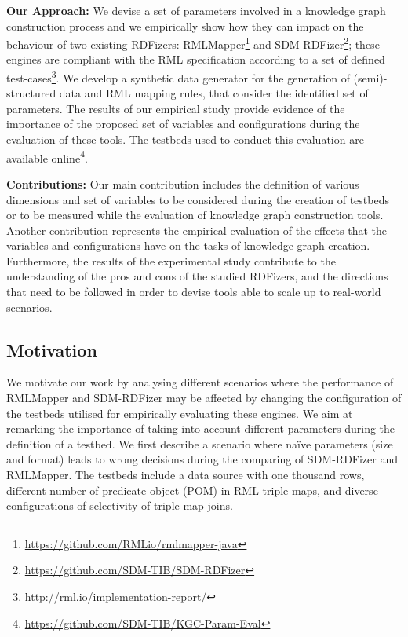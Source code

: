 \noindent \textbf{Our Approach:} We devise a set of parameters involved in a knowledge graph construction process and we empirically show how they can impact on the behaviour of two existing RDFizers: RMLMapper\footnote{\url{https://github.com/RMLio/rmlmapper-java}} and SDM-RDFizer\footnote{\url{https://github.com/SDM-TIB/SDM-RDFizer}}; these engines are compliant with the RML specification according to a set of defined test-cases\footnote{\url{http://rml.io/implementation-report/}}. We develop a synthetic data generator for the generation of (semi)-structured data and RML mapping rules, that consider the identified set of parameters.
The results of our empirical study provide evidence of the importance of the proposed set of variables and configurations during the evaluation of these tools. The testbeds used to conduct this evaluation are available
online\footnote{\url{https://github.com/SDM-TIB/KGC-Param-Eval}}.

\noindent \textbf{Contributions:} 
Our main contribution includes the definition of various dimensions and set of variables to be considered during the creation of testbeds or to be measured while the evaluation of knowledge graph construction tools.
Another contribution represents the empirical evaluation of the effects that the variables and configurations have on the tasks of knowledge graph creation. 
Furthermore, the results of the experimental study contribute to the understanding of the pros and cons of the studied RDFizers, and the directions that need to be followed in order to devise tools able to scale up to real-world scenarios.  

\subsection{Motivation}

We motivate our work by analysing different scenarios where the performance of RMLMapper and SDM-RDFizer may be affected by changing the configuration of the testbeds utilised for empirically evaluating these engines. We aim at remarking the importance of taking into account different parameters during the definition of a testbed.
We first describe a scenario where na\"ive parameters (size and format) leads to wrong decisions during the comparing of SDM-RDFizer and RMLMapper. The testbeds include a data source with one thousand rows, different number of  predicate-object (POM) in RML triple maps, and diverse configurations of selectivity of triple map joins.

